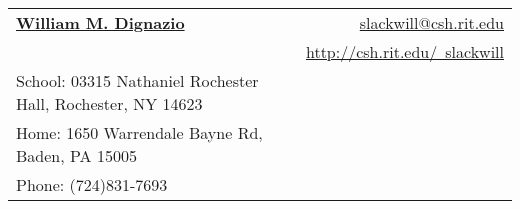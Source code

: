 \documentclass[letterpaper,11pt]{article}
\begin{document}
\newcommand{\mywebheader}{
\begin{tabular*}{7in}{l@{\extracolsep{\fill}}r}
	\textbf{\href{http://csh.rit.edu/~slackwill}{\Huge William M. Dignazio}} & \href{mailto:slackwill@csh.rit.edu}{slackwill@csh.rit.edu}\\ &
	\href{http://csh.rit.edu/~slackwill}{http://csh.rit.edu/~slackwill} \\
	{\footnotesize {{School: 03315 Nathaniel Rochester Hall,
Rochester, NY 14623}}} & \\
	{\footnotesize {{Home: 1650 Warrendale Bayne Rd, Baden, PA 15005}}} & \\
	{\footnotesize {{Phone: (724)831-7693}}} & 

	\end{tabular*}
\\
\vspace{0.1in}}

\mywebheader
\end{document}
